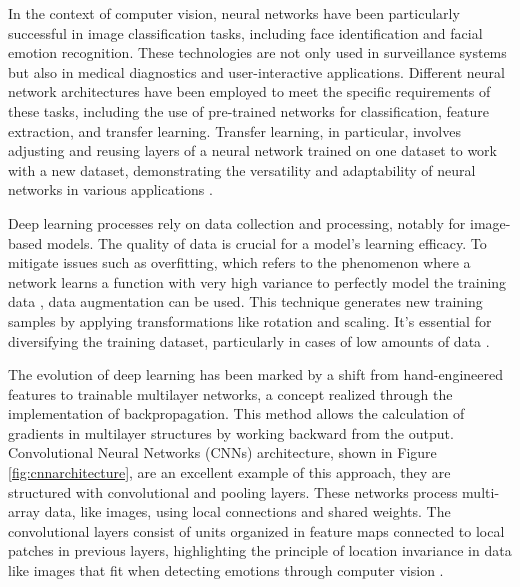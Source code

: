 \documentclass[runningheads]{llncs}
\begin{document}
In the context of computer vision, neural networks have been particularly successful in image classification tasks, including face identification and facial emotion recognition. These technologies are not only used in surveillance systems but also in medical diagnostics and user-interactive applications. Different neural network architectures have been employed to meet the specific requirements of these tasks, including the use of pre-trained networks for classification, feature extraction, and transfer learning. Transfer learning, in particular, involves adjusting and reusing layers of a neural network trained on one dataset to work with a new dataset, demonstrating the versatility and adaptability of neural networks in various applications \cite{Cirneanu2023} \cite{Zhao2015}.

Deep learning processes rely on data collection and processing, notably for image-based models. The quality of data is crucial for a model's learning efficacy. To mitigate issues such as overfitting, which refers to the phenomenon where a network learns a function with very high variance to perfectly model the training data \cite{Shorten2019}, data augmentation can be used. This technique generates new training samples by applying transformations like rotation and scaling. It's essential for diversifying the training dataset, particularly in cases of low amounts of data \cite{Khalifa2022}.

The evolution of deep learning has been marked by a shift from hand-engineered features to trainable multilayer networks, a concept realized through the implementation of backpropagation. This method allows the calculation of gradients in multilayer structures by working backward from the output. Convolutional Neural Networks (CNNs) architecture, shown in Figure \ref{fig:cnnarchitecture}, are an excellent example of this approach, they are structured with convolutional and pooling layers. These networks process multi-array data, like images, using local connections and shared weights. The convolutional layers consist of units organized in feature maps connected to local patches in previous layers, highlighting the principle of location invariance in data like images that fit when detecting emotions through computer vision \cite{Lecun2015}.
\end{document}
